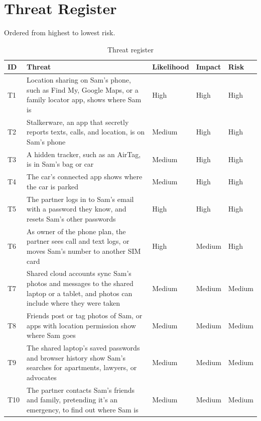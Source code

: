 \documentclass[11pt]{article}
\begin{document}
\section{Threat Register}
Ordered from highest to lowest risk.
\begin{table}[H]
\caption{Threat register}
\begin{tabular}{|m{}|m{}|m{}|m{}|m{}|}
\hline
\textbf{ID} & \textbf{Threat} & \textbf{Likeli\-hood} & \textbf{Impact} & \textbf{Risk} \\
\hline
T1 & Location sharing on Sam's phone, such as Find My, Google Maps, or a family locator app, shows where Sam is & High & High & High \\
\hline
T2 & Stalkerware, an app that secretly reports texts, calls, and location, is on Sam's phone & Medium & High & High \\
\hline
T3 & A hidden tracker, such as an AirTag, is in Sam's bag or car & Medium & High & High \\
\hline
T4 & The car's connected app shows where the car is parked & Medium & High & High \\
\hline
T5 & The partner logs in to Sam's email with a password they know, and resets Sam's other passwords & High & High & High \\
\hline
T6 & As owner of the phone plan, the partner sees call and text logs, or moves Sam's number to another SIM card & High & Medium & High \\
\hline
T7 & Shared cloud accounts sync Sam's photos and messages to the shared laptop or a tablet, and photos can include where they were taken & Medium & Medium & Medium \\
\hline
T8 & Friends post or tag photos of Sam, or apps with location permission show where Sam goes & Medium & Medium & Medium \\
\hline
T9 & The shared laptop's saved passwords and browser history show Sam's searches for apartments, lawyers, or advocates & Medium & Medium & Medium \\
\hline
T10 & The partner contacts Sam's friends and family, pretending it's an emergency, to find out where Sam is & Medium & Medium & Medium
\end{tabular}
\end{table}
\end{document}
